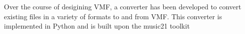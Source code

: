 
Over the course of desigining VMF, a converter has been developed to convert existing files in a variety of formats to and from VMF. This converter is implemented in Python and is built upon the music21 toolkit \citep*{CuAr10}